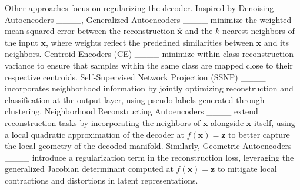 Other approaches focus on regularizing the decoder. Inspired by Denoising Autoencoders ____, Generalized Autoencoders ____ minimize the weighted mean squared error between the reconstruction \( \hat{\mathbf{x}} \) and the \( k \)-nearest neighbors of the input \( \mathbf{x} \), where weights reflect the predefined similarities between \( \mathbf{x} \) and its neighbors. Centroid Encoders (CE) ____ minimize within-class reconstruction variance to ensure that samples within the same class are mapped close to their respective centroids. Self-Supervised Network Projection (SSNP) ____ incorporates neighborhood information by jointly optimizing reconstruction and classification at the output layer, using pseudo-labels generated through clustering. Neighborhood Reconstructing Autoencoders ____ extend reconstruction tasks by incorporating the neighbors of \( \mathbf{x} \) alongside \( \mathbf{x} \) itself, using a local quadratic approximation of the decoder at \( f(\mathbf{x}) = \mathbf{z} \) to better capture the local geometry of the decoded manifold. Similarly, Geometric Autoencoders ____ introduce a regularization term in the reconstruction loss, leveraging the generalized Jacobian determinant computed at \( f(\mathbf{x}) = \mathbf{z} \) to mitigate local contractions and distortions in latent representations.

